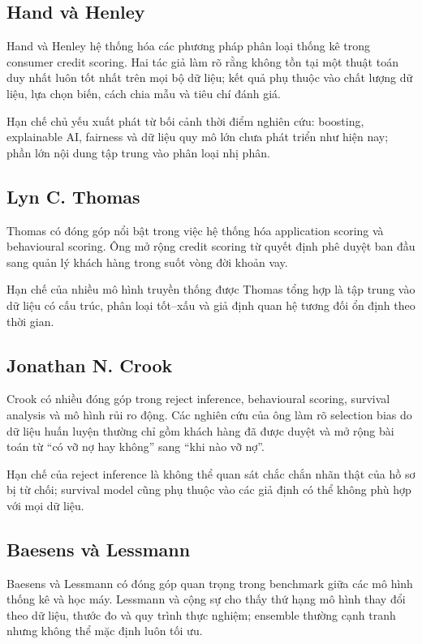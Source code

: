 \subsection{Hand và Henley}

Hand và Henley \cite{hand1997statistical} hệ thống hóa các phương pháp phân loại thống kê trong consumer credit scoring. Hai tác giả làm rõ rằng không tồn tại một thuật toán duy nhất luôn tốt nhất trên mọi bộ dữ liệu; kết quả phụ thuộc vào chất lượng dữ liệu, lựa chọn biến, cách chia mẫu và tiêu chí đánh giá.

Hạn chế chủ yếu xuất phát từ bối cảnh thời điểm nghiên cứu: boosting, explainable AI, fairness và dữ liệu quy mô lớn chưa phát triển như hiện nay; phần lớn nội dung tập trung vào phân loại nhị phân.

\subsection{Lyn C. Thomas}

Thomas \cite{thomas2000survey} có đóng góp nổi bật trong việc hệ thống hóa application scoring và behavioural scoring. Ông mở rộng credit scoring từ quyết định phê duyệt ban đầu sang quản lý khách hàng trong suốt vòng đời khoản vay.

Hạn chế của nhiều mô hình truyền thống được Thomas tổng hợp là tập trung vào dữ liệu có cấu trúc, phân loại tốt--xấu và giả định quan hệ tương đối ổn định theo thời gian.

\subsection{Jonathan N. Crook}

Crook có nhiều đóng góp trong reject inference, behavioural scoring, survival analysis và mô hình rủi ro động. Các nghiên cứu của ông làm rõ selection bias do dữ liệu huấn luyện thường chỉ gồm khách hàng đã được duyệt và mở rộng bài toán từ ``có vỡ nợ hay không'' sang ``khi nào vỡ nợ''.

Hạn chế của reject inference là không thể quan sát chắc chắn nhãn thật của hồ sơ bị từ chối; survival model cũng phụ thuộc vào các giả định có thể không phù hợp với mọi dữ liệu.

\subsection{Baesens và Lessmann}

Baesens và Lessmann có đóng góp quan trọng trong benchmark giữa các mô hình thống kê và học máy. Lessmann và cộng sự \cite{lessmann2015benchmarking} cho thấy thứ hạng mô hình thay đổi theo dữ liệu, thước đo và quy trình thực nghiệm; ensemble thường cạnh tranh nhưng không thể mặc định luôn tối ưu.

